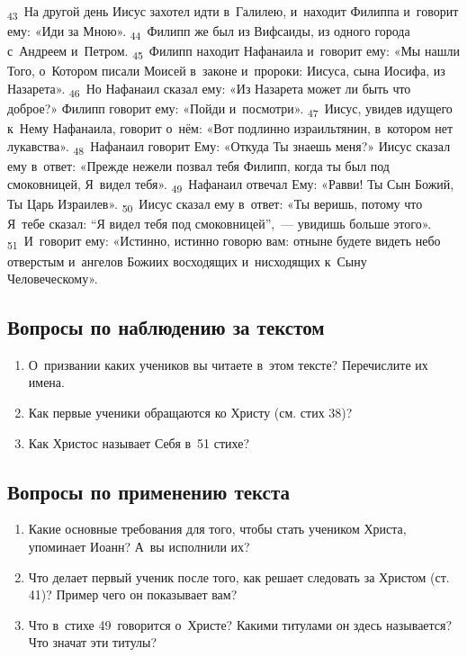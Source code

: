 \documentclass[a4paper,12pt]{article}
\begin{document}
\textsubscript{43}~На другой день Иисус захотел идти в~Галилею, и~находит Филиппа и~говорит ему: «Иди за Мною». \textsubscript{44}~Филипп же был из Вифсаиды, из одного города с~Андреем и~Петром. \textsubscript{45}~Филипп находит Нафанаила и~говорит ему: «Мы нашли Того, о~Котором писали Моисей в~законе и~пророки: Иисуса, сына Иосифа, из Назарета». \textsubscript{46}~Но Нафанаил сказал ему: «Из Назарета может ли быть что доброе?» Филипп говорит ему: «Пойди и~посмотри». \textsubscript{47}~Иисус, увидев идущего к~Нему Нафанаила, говорит о~нём: «Вот подлинно израильтянин, в~котором нет лукавства». \textsubscript{48}~Нафанаил говорит Ему: «Откуда Ты знаешь меня?» Иисус сказал ему в~ответ: «Прежде нежели позвал тебя Филипп, когда ты был под смоковницей, Я~видел тебя». \textsubscript{49}~Нафанаил отвечал Ему: «Равви! Ты Сын Божий, Ты Царь Израилев». \textsubscript{50}~Иисус сказал ему в~ответ: «Ты веришь, потому что Я~тебе сказал: “Я видел тебя под смоковницей”,~--- увидишь больше этого». \textsubscript{51}~И~говорит ему: «Истинно, истинно говорю вам: отныне будете видеть небо отверстым и~ангелов Божиих восходящих и~нисходящих к~Сыну Человеческому». 

\subsection*{Вопросы по наблюдению за текстом}
\begin{enumerate}
    \item О~призвании каких учеников вы читаете в~этом тексте? Перечислите их имена. 
    
    \myline
    
    \myline
    \item Как первые ученики обращаются ко Христу (см. стих 38)? 
    
    \myline
    
    \myline
    \item Как Христос называет Себя в~51 стихе?
    
    \myline
    
    \myline
\end{enumerate}

\subsection*{Вопросы по применению текста} 
\begin{enumerate}
    \item Какие основные требования для того, чтобы стать учеником Христа, упоминает Иоанн? А~вы исполнили их? 
    
    \myline
    
    \myline
    \item Что делает первый ученик после того, как решает следовать за Христом (ст. 41)? Пример чего он показывает вам? 
    
    \myline
    
    \myline
    \item Что в~стихе 49~говорится о~Христе? Какими титулами он здесь называется? Что значат эти титулы? 
    
    \myline
    
    \myline
\end{enumerate}
\end{document}
